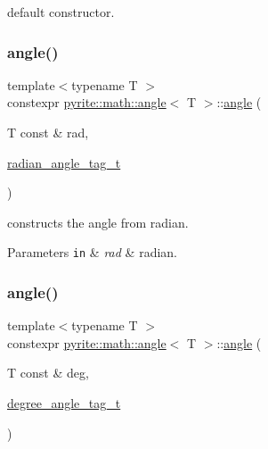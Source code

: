 default constructor. \mbox{\label{classpyrite_1_1math_1_1angle_a2c9aeede6bd0edf739a440515ea20f0c}} 
\subsubsection{\texorpdfstring{angle()}{angle()}\hspace{0.1cm}{\footnotesize\ttfamily [2/5]}}
{\footnotesize\ttfamily template$<$typename T $>$ \\
constexpr \mbox{\hyperlink{classpyrite_1_1math_1_1angle}{pyrite\+::math\+::angle}}$<$ T $>$\+::\mbox{\hyperlink{classpyrite_1_1math_1_1angle}{angle}} (\begin{DoxyParamCaption}\item[{T const \&}]{rad,  }\item[{\mbox{\hyperlink{structpyrite_1_1math_1_1radian__angle__tag__t}{radian\+\_\+angle\+\_\+tag\+\_\+t}}}]{ }\end{DoxyParamCaption})\hspace{0.3cm}{\ttfamily [inline]}}

constructs the angle from radian.


\begin{DoxyParams}[1]{Parameters}
\mbox{\tt in}  & {\em rad} & radian. \\
\hline
\end{DoxyParams}
\mbox{\label{classpyrite_1_1math_1_1angle_ab983c2beb0c1c127844dd437ffb5a6d6}} 
\subsubsection{\texorpdfstring{angle()}{angle()}\hspace{0.1cm}{\footnotesize\ttfamily [3/5]}}
{\footnotesize\ttfamily template$<$typename T $>$ \\
constexpr \mbox{\hyperlink{classpyrite_1_1math_1_1angle}{pyrite\+::math\+::angle}}$<$ T $>$\+::\mbox{\hyperlink{classpyrite_1_1math_1_1angle}{angle}} (\begin{DoxyParamCaption}\item[{T const \&}]{deg,  }\item[{\mbox{\hyperlink{structpyrite_1_1math_1_1degree__angle__tag__t}{degree\+\_\+angle\+\_\+tag\+\_\+t}}}]{ }\end{DoxyParamCaption})\hspace{0.3cm}{\ttfamily [inline]}}

